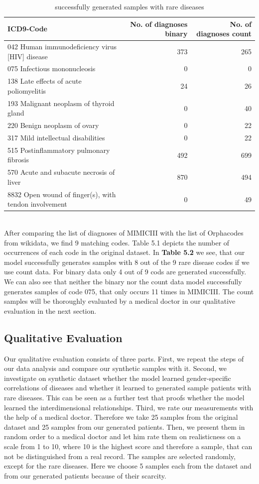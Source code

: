 \documentclass[11pt, a4paper]{book}
\begin{document}
\begin{table}
\begin{tabularx}{\textwidth}{X|r|r}
ICD9-Code & No. of diagnoses binary & No. of diagnoses count\\
\hline
042 Human immunodeficiency virus [HIV] disease	& 373 & 265\\
075 Infectious mononucleosis & 0 & 0\\
138 Late effects of acute poliomyelitis & 24  & 26\\
193 Malignant neoplasm of thyroid gland & 0 & 40\\
220 Benign neoplasm of ovary & 0 & 22\\
317 Mild intellectual disabilities & 0 & 22\\
515 Postinflammatory pulmonary fibrosis & 492 & 699\\
570 Acute and subacute necrosis of liver & 870 & 494\\
8832 Open wound of finger(s), with tendon involvement & 0 & 49\\ 
\end{tabularx}
\caption{\label{tab:rare-generated}successfully generated samples with rare diseases}
\end{table}

\\
After comparing the list of diagnoses of MIMICIII with the list of Orphacodes from wikidata, we find 9 matching codes. Table 5.1 depicts the number of occurrences of each code in the original dataset. In \textbf{Table 5.2} we see, that our model successfully generates samples with 8 out of the 9 rare disease codes if we use count data. For binary data only 4 out of 9 cods are generated successfully. We can also see that neither the binary nor the count data model successfully generates samples of code 075, that only occurs 11 times in MIMICIII. 
The count samples will be thoroughly evaluated by a medical doctor in our qualitative evaluation in the next section.


\subsection{Qualitative Evaluation}
Our qualitative evaluation consists of three parts. First, we repeat the steps of our data analysis and compare our synthetic samples with it. Second, we investigate on synthetic dataset whether the model learned gender-specific correlations of diseases and whether it learned to generated sample patients with rare diseases. This can be seen as a further test that proofs whether the model learned the interdimensional relationships. Third, we rate our measurements with the help of a medical doctor. Therefore we take 25 samples from the original dataset and 25 samples from our generated patients. Then, we present them in random order to a medical doctor and let him rate them on realisticness on a scale from 1 to 10, where 10 is the highest score and therefore a sample, that can not be distinguished from a real record.
The samples are selected randomly, except for the rare diseases. Here we choose 5 samples each from the dataset and from our generated patients because of their scarcity.
\end{document}

